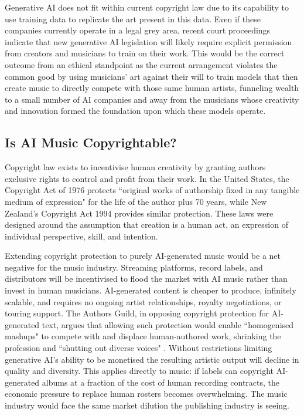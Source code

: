 \documentclass{article}
\begin{document}
Generative AI does not fit within current copyright law due to its capability to use training data to replicate the art present in this data. Even if these companies currently operate in a legal grey area, recent court proceedings indicate that new generative AI legislation will likely require explicit permission from creators and musicians to train on their work. This would be the correct outcome from an ethical standpoint as the current arrangement violates the common good by using musicians' art against their will to train models that then create music to directly compete with those same human artists, funneling wealth to a small number of AI companies and away from the musicians whose creativity and innovation formed the foundation upon which these models operate.

\subsection{Is AI Music Copyrightable?}
Copyright law exists to incentivise human creativity by granting authors exclusive rights to control and profit from their work. In the United States, the Copyright Act of 1976 protects ``original works of authorship fixed in any tangible medium of expression" for the life of the author plus 70 years, while New Zealand's Copyright Act 1994 provides similar protection. These laws were designed around the assumption that creation is a human act, an expression of individual perspective, skill, and intention.

Extending copyright protection to purely AI-generated music would be a net negative for the music industry. Streaming platforms, record labels, and distributors will be incentivised to flood the market with AI music rather than invest in human musicians. AI-generated content is cheaper to produce, infinitely scalable, and requires no ongoing artist relationships, royalty negotiations, or touring support. The Authors Guild, in opposing copyright protection for AI-generated text, argues that allowing such protection would enable ``homogenised mashups" to compete with and displace human-authored work, shrinking the profession and ``shutting out diverse voices" \cite{authorsguild_ai}. Without restrictions limiting generative AI's ability to be monetised the resulting artistic output will decline in quality and diversity. This applies directly to music: if labels can copyright AI-generated albums at a fraction of the cost of human recording contracts, the economic pressure to replace human rosters becomes overwhelming. The music industry would face the same market dilution the publishing industry is seeing.
\end{document}
